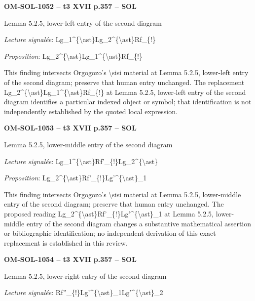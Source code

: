 \par\noindent\textbf{OM-SOL-1052 -- t3 XVII p.357 -- SOL}\par
Lemma 5.2.5, lower-left entry of the second diagram\par
\emph{Lecture signalée}: Lg\_1\textasciicircum{}\{\textbackslash{}ast\}Lg\_2\textasciicircum{}\{\textbackslash{}ast\}Rf\_\{!\}\par
\emph{Proposition}: Lg\_2\textasciicircum{}\{\textbackslash{}ast\}Lg\_1\textasciicircum{}\{\textbackslash{}ast\}Rf\_\{!\}\par
This finding intersects Orgogozo's \textbackslash{}sisi material at Lemma 5.2.5, lower-left entry of the second diagram; preserve that human entry unchanged. The replacement Lg\_2\textasciicircum{}\{\textbackslash{}ast\}Lg\_1\textasciicircum{}\{\textbackslash{}ast\}Rf\_\{!\} at Lemma 5.2.5, lower-left entry of the second diagram identifies a particular indexed object or symbol; that identification is not independently established by the quoted local expression.\par
\par\noindent\textbf{OM-SOL-1053 -- t3 XVII p.357 -- SOL}\par
Lemma 5.2.5, lower-middle entry of the second diagram\par
\emph{Lecture signalée}: Lg\_1\textasciicircum{}\{\textbackslash{}ast\}Rf'\_\{!\}Lg\_2\textasciicircum{}\{\textbackslash{}ast\}\par
\emph{Proposition}: Lg\_2\textasciicircum{}\{\textbackslash{}ast\}Rf'\_\{!\}Lg'\textasciicircum{}\{\textbackslash{}ast\}\_1\par
This finding intersects Orgogozo's \textbackslash{}sisi material at Lemma 5.2.5, lower-middle entry of the second diagram; preserve that human entry unchanged. The proposed reading Lg\_2\textasciicircum{}\{\textbackslash{}ast\}Rf'\_\{!\}Lg'\textasciicircum{}\{\textbackslash{}ast\}\_1 at Lemma 5.2.5, lower-middle entry of the second diagram changes a substantive mathematical assertion or bibliographic identification; no independent derivation of this exact replacement is established in this review.\par
\par\noindent\textbf{OM-SOL-1054 -- t3 XVII p.357 -- SOL}\par
Lemma 5.2.5, lower-right entry of the second diagram\par
\emph{Lecture signalée}: Rf''\_\{!\}Lg'\textasciicircum{}\{\textbackslash{}ast\}\_1Lg'\textasciicircum{}\{\textbackslash{}ast\}\_2\par
